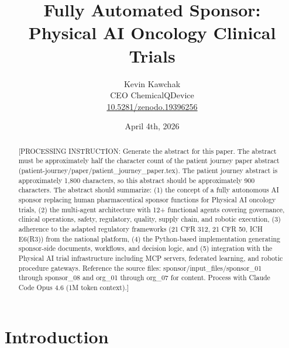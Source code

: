 \documentclass{article}
\title{Fully Automated Sponsor:\\Physical AI Oncology Clinical Trials}
\author{
  Kevin Kawchak\hspace{2pt}\orcidicon{0009-0007-5457-8667} \\
  CEO ChemicalQDevice\\
  \href{https://doi.org/10.5281/zenodo.19396256}{10.5281/zenodo.19396256} \\
}
\date{April 4th, 2026}
\begin{document}
\maketitle

\begin{abstract}
[PROCESSING INSTRUCTION: Generate the abstract for this paper. The abstract must be approximately
half the character count of the patient journey paper abstract (patient-journey/paper/patient\_journey\_paper.tex).
The patient journey abstract is approximately 1,800 characters, so this abstract should be approximately
900 characters. The abstract should summarize: (1) the concept of a fully autonomous AI sponsor replacing
human pharmaceutical sponsor functions for Physical AI oncology trials, (2) the multi-agent architecture
with 12+ functional agents covering governance, clinical operations, safety, regulatory, quality, supply
chain, and robotic execution, (3) adherence to the adapted regulatory frameworks (21 CFR 312, 21 CFR 50,
ICH E6(R3)) from the national platform, (4) the Python-based implementation generating sponsor-side
documents, workflows, and decision logic, and (5) integration with the Physical AI trial infrastructure
including MCP servers, federated learning, and robotic procedure gateways. Reference the source files:
sponsor/input\_files/sponsor\_01 through sponsor\_08 and org\_01 through org\_07 for content.
Process with Claude Code Opus 4.6 (1M token context).]
\end{abstract}


\vspace{-0.2cm}

\section{Introduction}
\label{sec:introduction}


\newpage
\tableofcontents
\newpage
\end{document}
